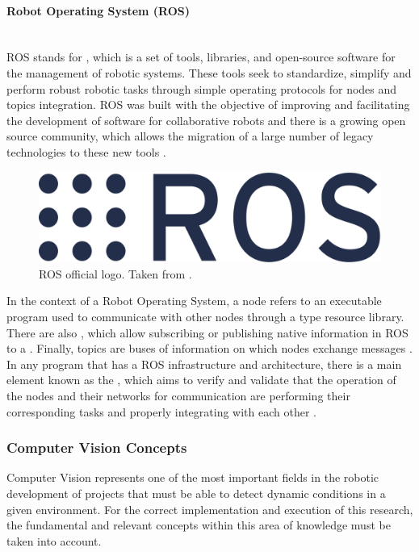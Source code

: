 \documentclass[11pt]{report} %
\newcommand{\subsubsubsection}[1]{\paragraph{#1}\mbox{}\\}
\begin{document}
\subsubsubsection{Robot Operating System (ROS)}

ROS stands for , which is a set of tools, libraries, and open-source software for the management of robotic systems. These tools seek to standardize, simplify and perform robust robotic tasks through simple operating protocols for nodes and topics integration. ROS was built with the objective of improving and facilitating the development of software for collaborative robots and there is a growing open source community, which allows the migration of a large number of legacy technologies to these new tools \citep{cite_ROS_official_site}.\\

\begin{figure}[H]
    \centering
    \includegraphics[width=0.4\linewidth]{assets/imgs/reference_framework/ros_main_logo.png}
    \caption{ROS official logo. Taken from \citep{cite_ROS_official_site}.} 
    \label{fig_ros_main_logo}
\end{figure}

In the context of a Robot Operating System, a node refers to an executable program used to communicate with other nodes through a  type resource library. There are also , which allow subscribing or publishing native information in ROS to a . Finally, topics are buses of information on which nodes exchange messages \citep{cite_ROS_understanding_nodes}.\\

In any program that has a ROS infrastructure and architecture, there is a main element known as the , which aims to verify and validate that the operation of the nodes and their networks for communication are performing their corresponding tasks and properly integrating with each other \citep{cite_ROS_understanding_nodes}.\\


\subsubsection{Computer Vision Concepts}

Computer Vision represents one of the most important fields in the robotic development of projects that must be able to detect dynamic conditions in a given environment. For the correct implementation and execution of this research, the fundamental and relevant concepts within this area of knowledge must be taken into account.\\
\end{document}
